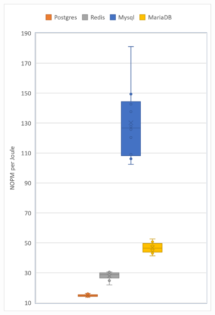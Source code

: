 \begin{figure}[h!]
\includegraphics[width=0.6\columnwidth]{results/boxplot/Total-nopm.png}
\label{fig:bocplotnumber}	
\end{figure}


